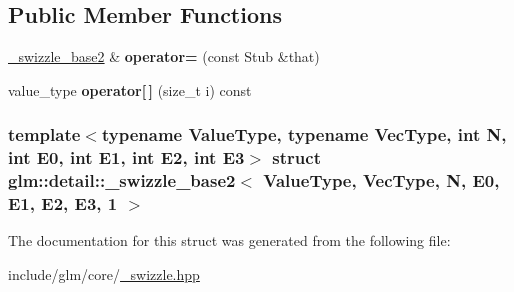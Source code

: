 \subsection*{\-Public \-Member \-Functions}
\begin{DoxyCompactItemize}
\item 
\hypertarget{structglm_1_1detail_1_1__swizzle__base2_3_01ValueType_00_01VecType_00_01N_00_01E0_00_01E1_00_01E2_00_01E3_00_011_01_4_a40ef0e0cf30f7f745874e2dabd8dfb34}{\hyperlink{structglm_1_1detail_1_1__swizzle__base2}{\-\_\-swizzle\-\_\-base2} \& {\bfseries operator=} (const \-Stub \&that)}\label{structglm_1_1detail_1_1__swizzle__base2_3_01ValueType_00_01VecType_00_01N_00_01E0_00_01E1_00_01E2_00_01E3_00_011_01_4_a40ef0e0cf30f7f745874e2dabd8dfb34}

\item 
\hypertarget{structglm_1_1detail_1_1__swizzle__base2_3_01ValueType_00_01VecType_00_01N_00_01E0_00_01E1_00_01E2_00_01E3_00_011_01_4_af6e79bb269160e9d1c7e3959bbd7acc2}{value\-\_\-type {\bfseries operator\mbox{[}$\,$\mbox{]}} (size\-\_\-t i) const }\label{structglm_1_1detail_1_1__swizzle__base2_3_01ValueType_00_01VecType_00_01N_00_01E0_00_01E1_00_01E2_00_01E3_00_011_01_4_af6e79bb269160e9d1c7e3959bbd7acc2}

\end{DoxyCompactItemize}
\subsubsection*{template$<$typename Value\-Type, typename Vec\-Type, int \-N, int \-E0, int \-E1, int \-E2, int \-E3$>$ struct glm\-::detail\-::\-\_\-swizzle\-\_\-base2$<$ Value\-Type, Vec\-Type, N, E0, E1, E2, E3, 1 $>$}



\-The documentation for this struct was generated from the following file\-:\begin{DoxyCompactItemize}
\item 
include/glm/core/\hyperlink{__swizzle_8hpp}{\-\_\-swizzle.\-hpp}\end{DoxyCompactItemize}
